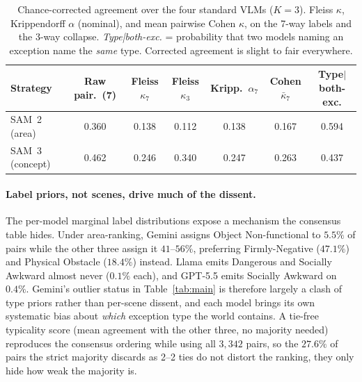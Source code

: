 \documentclass[runningheads]{llncs}
\begin{document}
\begin{table}[t]
  \centering
  \footnotesize
  \caption{Chance-corrected agreement over the four standard VLMs ($K=3$). Fleiss $\kappa$, Krippendorff $\alpha$ (nominal), and mean pairwise Cohen $\kappa$, on the 7-way labels and the 3-way collapse. \emph{Type|both-exc.} = probability that two models naming an exception name the \emph{same} type. Corrected agreement is slight to fair everywhere.}
  \label{tab:kappa}
  \begin{tabular}{lcccccc}
    \toprule
    Strategy & Raw pair.\ (7) & Fleiss $\kappa_7$ & Fleiss $\kappa_3$ & Kripp.\ $\alpha_7$ & Cohen $\bar\kappa_7$ & Type$\vert$both-exc. \\
    \midrule
    SAM~2 (area)    & 0.360 & 0.138 & 0.112 & 0.138 & 0.167 & 0.594 \\
    SAM~3 (concept) & 0.462 & 0.246 & 0.340 & 0.247 & 0.263 & 0.437 \\
    \bottomrule
  \end{tabular}
\end{table}

\paragraph{Label priors, not scenes, drive much of the dissent.}
The per-model marginal label distributions expose a mechanism the consensus table hides.
Under area-ranking, Gemini assigns Object Non-functional to $5.5\%$ of pairs while the other three assign it $41$--$56\%$, preferring Firmly-Negative ($47.1\%$) and Physical Obstacle ($18.4\%$) instead.
Llama emits Dangerous and Socially Awkward almost never ($0.1\%$ each), and GPT-5.5 emits Socially Awkward on $0.4\%$.
Gemini's outlier status in Table~\ref{tab:main} is therefore largely a clash of type priors rather than per-scene dissent, and each model brings its own systematic bias about \emph{which} exception type the world contains.
A tie-free typicality score (mean agreement with the other three, no majority needed) reproduces the consensus ordering while using all $3{,}342$ pairs, so the $27.6\%$ of pairs the strict majority discards as 2--2 ties do not distort the ranking, they only hide how weak the majority is.
\end{document}
